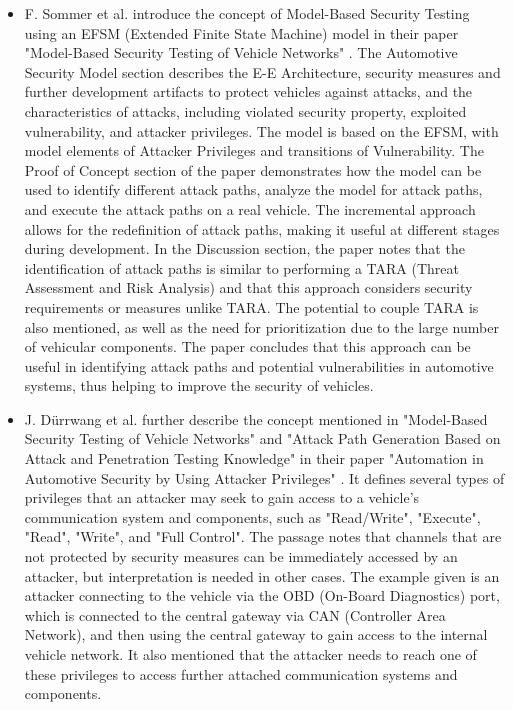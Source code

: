 \begin{itemize}

\item F. Sommer et al. introduce the concept of Model-Based Security Testing using an EFSM (Extended Finite State Machine) model in their paper "Model-Based Security Testing of Vehicle Networks" \cite{model_based_testing}.
The Automotive Security Model section describes the E-E Architecture, security measures and further development artifacts to protect vehicles against attacks, and the characteristics of attacks, including violated security property, exploited vulnerability, and attacker privileges. 
The model is based on the EFSM, with model elements of Attacker Privileges and transitions of Vulnerability.
The Proof of Concept section of the paper demonstrates how the model can be used to identify different attack paths, analyze the model for attack paths, and execute the attack paths on a real vehicle. 
The incremental approach allows for the redefinition of attack paths, making it useful at different stages during development.
In the Discussion section, the paper notes that the identification of attack paths is similar to performing a TARA (Threat Assessment and Risk Analysis) and that this approach considers security requirements or measures unlike TARA. 
The potential to couple TARA is also mentioned, as well as the need for prioritization due to the large number of vehicular components. 
The paper concludes that this approach can be useful in identifying attack paths and potential vulnerabilities in automotive systems, thus helping to improve the security of vehicles.

\item J. Dürrwang et al. further describe the concept mentioned in "Model-Based Security Testing of Vehicle Networks" and "Attack Path Generation Based on Attack and Penetration Testing Knowledge" in their paper "Automation in Automotive Security by Using Attacker Privileges" \cite{attacker_privileges}.
It defines several types of privileges that an attacker may seek to gain access to a vehicle's communication system and components, such as "Read/Write", "Execute", "Read", "Write", and "Full Control".
The passage notes that channels that are not protected by security measures can be immediately accessed by an attacker, but interpretation is needed in other cases. 
The example given is an attacker connecting to the vehicle via the OBD (On-Board Diagnostics) port, which is connected to the central gateway via CAN (Controller Area Network), and then using the central gateway to gain access to the internal vehicle network.
It also mentioned that the attacker needs to reach one of these privileges to access further attached communication systems and components. 



\end{itemize}
